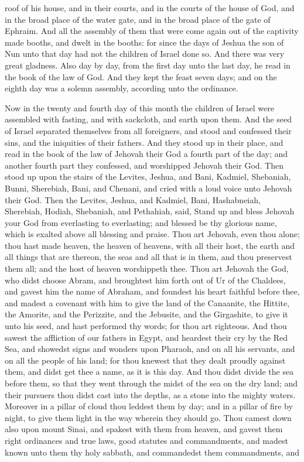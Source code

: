 roof of his house, and in their courts, and in the courts of the house of God, and in the broad place of the water gate, and in the broad place of the gate of Ephraim. And all the assembly of them that were come again out of the captivity made booths, and dwelt in the booths: for since the days of Jeshua the son of Nun unto that day had not the children of Israel done so. And there was very great gladness. Also day by day, from the first day unto the last day, he read in the book of the law of God. And they kept the feast seven days; and on the eighth day was a solemn assembly, according unto the ordinance. 

Now in the twenty and fourth day of this month the children of Israel were assembled with fasting, and with sackcloth, and earth upon them. And the seed of Israel separated themselves from all foreigners, and stood and confessed their sins, and the iniquities of their fathers. And they stood up in their place, and read in the book of the law of Jehovah their God a fourth part of the day; and another fourth part they confessed, and worshipped Jehovah their God. Then stood up upon the stairs of the Levites, Jeshua, and Bani, Kadmiel, Shebaniah, Bunni, Sherebiah, Bani, and Chenani, and cried with a loud voice unto Jehovah their God.  Then the Levites, Jeshua, and Kadmiel, Bani, Hashabneiah, Sherebiah, Hodiah, Shebaniah, and Pethahiah, said, Stand up and bless Jehovah your God from everlasting to everlasting; and blessed be thy glorious name, which is exalted above all blessing and praise. Thou art Jehovah, even thou alone; thou hast made heaven, the heaven of heavens, with all their host, the earth and all things that are thereon, the seas and all that is in them, and thou preservest them all; and the host of heaven worshippeth thee. Thou art Jehovah the God, who didst choose Abram, and broughtest him forth out of Ur of the Chaldees, and gavest him the name of Abraham, and foundest his heart faithful before thee, and madest a covenant with him to give the land of the Canaanite, the Hittite, the Amorite, and the Perizzite, and the Jebusite, and the Girgashite, to give it unto his seed, and hast performed thy words; for thou art righteous.  And thou sawest the affliction of our fathers in Egypt, and heardest their cry by the Red Sea, and showedst signs and wonders upon Pharaoh, and on all his servants, and on all the people of his land; for thou knewest that they dealt proudly against them, and didst get thee a name, as it is this day. And thou didst divide the sea before them, so that they went through the midst of the sea on the dry land; and their pursuers thou didst cast into the depths, as a stone into the mighty waters. Moreover in a pillar of cloud thou leddest them by day; and in a pillar of fire by night, to give them light in the way wherein they should go. Thou camest down also upon mount Sinai, and spakest with them from heaven, and gavest them right ordinances and true laws, good statutes and commandments, and madest known unto them thy holy sabbath, and commandedst them commandments, and 